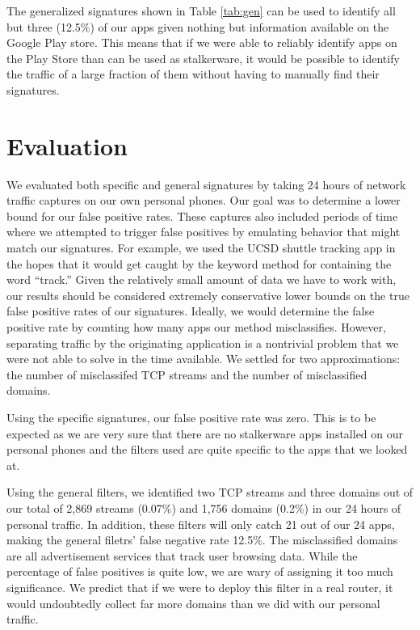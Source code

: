 \documentclass[acmtog]{acmart}
\begin{document}
The generalized signatures shown in Table \ref{tab:gen} can be used to identify 
all but three (12.5\%) of our apps given nothing but information available on 
the Google Play store. This means that if we were able to reliably identify 
apps on the 
Play Store than can be used as stalkerware, it would be possible to identify 
the traffic of a large fraction of them without having to manually find their 
signatures.


\section{Evaluation}

We evaluated both specific and general signatures by taking 24 hours 
of network traffic captures on our own personal phones. Our goal was to 
determine a lower bound for our false positive rates. These 
captures also included periods of time where we attempted to trigger false 
positives by emulating behavior that might match our 
signatures. For example, we used the UCSD shuttle tracking app in the hopes 
that it would get caught by the keyword method for containing the word 
``track.'' Given the relatively small 
amount of data we have to work with, our 
results should be considered extremely conservative lower bounds on the true 
false positive rates of our signatures. Ideally, we would determine the false 
positive rate by counting how many apps our method misclassifies. However, 
separating traffic by the originating application is a nontrivial problem that 
we were not able to solve in the time available. We settled for two 
approximations: the number of misclassifed TCP streams and the number of 
misclassified domains.

Using the specific signatures, our false positive rate was zero. This is to be 
expected as we are very sure that there 
are no stalkerware apps installed on our personal phones and the filters used 
are quite specific to the apps that we looked at. 

Using the general filters, we identified two TCP streams and three domains out 
of our total of 2,869 streams (0.07\%) and 1,756 domains (0.2\%) in our 24 
hours of personal traffic. In addition, these filters will only catch 21 out of 
our 24 apps, making the general filetrs' false negative rate 12.5\%. The 
misclassified domains are all advertisement services that 
track user browsing data. While the percentage of false positives is quite low, 
we are wary of assigning it too much significance. We predict that if we were 
to deploy this filter in a real router, it 
would undoubtedly collect far more domains than we did with our personal 
traffic.
\end{document}
